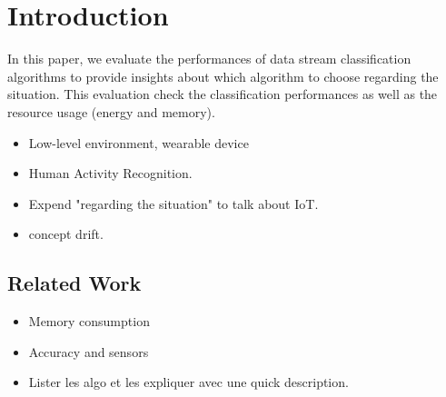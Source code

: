 \section{Introduction}
\label{sec:introduction}

In this paper, we evaluate the performances of
data stream classification algorithms to provide
insights about which algorithm to choose regarding
the situation.
This evaluation check the classification
performances as well as the resource usage (energy
and memory).

\begin{itemize}
		\item Low-level environment, wearable device
		\item Human Activity Recognition.
		\item Expend "regarding the situation" to talk about IoT.
		\item concept drift.
\end{itemize}




\subsection{Related Work}
\begin{itemize}
	\item Memory consumption~\cite{memory_consumption_machine_learning}
  \item Accuracy and sensors~\cite{Janidarmian_2017}
\end{itemize}
\begin{itemize}
	\item Lister les algo et les expliquer avec une quick description.
\end{itemize}
